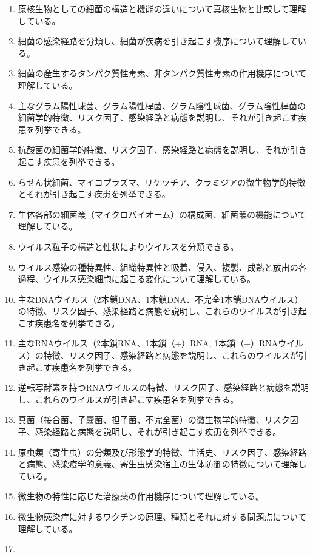 \begin{enumerate}
\def\labelenumi{\arabic{enumi}.}
\tightlist
\item
  原核生物としての細菌の構造と機能の違いについて真核生物と比較して理解している。
\item
  細菌の感染経路を分類し、細菌が疾病を引き起こす機序について理解している。
\item
  細菌の産生するタンパク質性毒素、非タンパク質性毒素の作用機序について理解している。
\item
  主なグラム陽性球菌、グラム陽性桿菌、グラム陰性球菌、グラム陰性桿菌の細菌学的特徴、リスク因子、感染経路と病態を説明し、それが引き起こす疾患を列挙できる。
\item
  抗酸菌の細菌学的特徴、リスク因子、感染経路と病態を説明し、それが引き起こす疾患を列挙できる。
\item
  らせん状細菌、マイコプラズマ、リケッチア、クラミジアの微生物学的特徴とそれが引き起こす疾患を列挙できる。
\item
  生体各部の細菌叢（マイクロバイオーム）の構成菌、細菌叢の機能について理解している。
\item
  ウイルス粒子の構造と性状によりウイルスを分類できる。
\item
  ウイルス感染の種特異性、組織特異性と吸着、侵入、複製、成熟と放出の各過程、ウイルス感染細胞に起こる変化について理解している。
\item
  主なDNAウイルス（2本鎖DNA、1本鎖DNA、不完全1本鎖DNAウイルス）の特徴、リスク因子、感染経路と病態を説明し、これらのウイルスが引き起こす疾患名を列挙できる。
\item
  主なRNAウイルス（2本鎖RNA、1本鎖（+）RNA,
  1本鎖（−）RNAウイルス）の特徴、リスク因子、感染経路と病態を説明し、これらのウイルスが引き起こす疾患名を列挙できる。
\item
  逆転写酵素を持つRNAウイルスの特徴、リスク因子、感染経路と病態を説明し、これらのウイルスが引き起こす疾患名を列挙できる。
\item
  真菌（接合菌、子嚢菌、担子菌、不完全菌）の微生物学的特徴、リスク因子、感染経路と病態を説明し、それが引き起こす疾患を列挙できる。
\item
  原虫類（寄生虫）の分類及び形態学的特徴、生活史、リスク因子、感染経路と病態、感染疫学的意義、寄生虫感染宿主の生体防御の特徴について理解している。
\item
  微生物の特性に応じた治療薬の作用機序について理解している。
\item
  微生物感染症に対するワクチンの原理、種類とそれに対する問題点について理解している。
\item

\end{enumerate}

